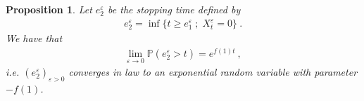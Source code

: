 \documentclass[reqno, 12pt, a4paper]{amsart}
\theoremstyle{plain}
\newtheorem{proposition}[theorem]{Proposition}
\theoremstyle{definition}
\begin{document}
\begin{proposition}
\label{prop:e_2}
Let $e^\varepsilon_2$ be the stopping time defined by 
\begin{equation}
\begin{split}
e^\varepsilon_2 = \inf \{ t \ge e_1^\varepsilon \; ; \; X_t^\varepsilon =0 \} \ .
\end{split}
\end{equation}
We have that
\begin{equation}
\begin{split}
\lim_{\varepsilon \to 0} \mathbb P (e^\varepsilon_2 > t)  = e^{f(1) t}  \ ,
\end{split}
\end{equation}
i.e. $(e^\varepsilon_2)_{\varepsilon>0}$ converges in law to an exponential random variable with parameter $-f(1)$.
\end{proposition} 
%
\end{document}
